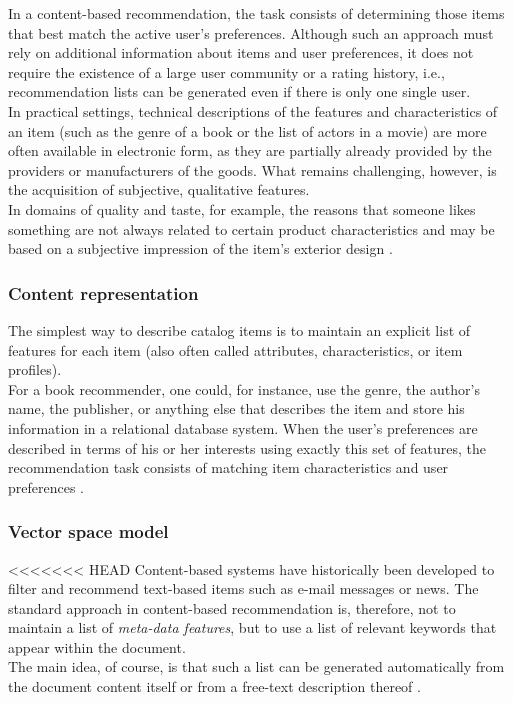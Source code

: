 In a content-based recommendation, the task consists of
determining those items that best match the active user’s preferences.
Although such an approach must rely on additional information about
items and user preferences, it does not require the existence of a
large user community or a rating history, i.e., recommendation lists
can be generated even if there is only one single user. \\In practical
settings, technical descriptions of the features and characteristics
of an item (such as the genre of a book or the list of actors in a
movie) are more often available in electronic form, as they are
partially already provided by the providers or manufacturers of the
goods. What remains challenging, however, is the acquisition of
subjective, qualitative features. \\ In domains of quality and taste,
for example, the reasons that someone likes something are not always
related to certain product characteristics and may be based on a
subjective impression of the item’s exterior design
 \cite{jannach2010recommender}.

\subsubsection{Content representation} 

The simplest way to describe catalog items is to maintain an explicit
list of features for each item (also often called attributes,
characteristics, or item profiles). \\For a book recommender, one could,
for instance, use the genre, the author’s name, the publisher, or
anything else that describes the item and store his information in a
relational database system. When the user’s preferences are described
in terms of his or her interests using exactly this set of features,
the recommendation task consists of matching item characteristics and
user preferences  \cite{jannach2010recommender}.

\subsubsection{Vector space model}  

<<<<<<< HEAD
Content-based systems have historically been developed to filter and
recommend text-based items such as e-mail messages or news.  The
standard approach in content-based recommendation is, therefore,  not
to maintain a list of \textit{meta-data features}, but to use a list
of relevant keywords that appear within the document. \\The main idea,
of course, is that such a list can be generated automatically from the
document content itself or from a free-text description thereof
\cite{jannach2010recommender}.

